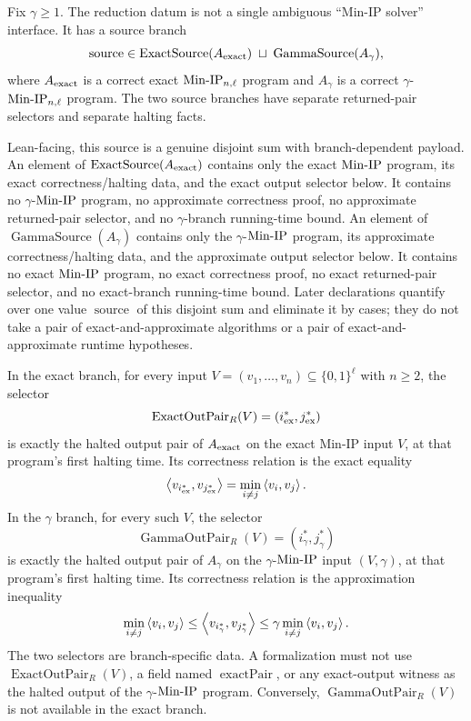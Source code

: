 \begin{definition}
  \label{def:ov-from-minip-reduction-datum}
  Fix $\gamma\geq1$.  The reduction datum is not a single ambiguous
  ``Min-IP solver'' interface.  It has a source branch
  \[
    \operatorname{source}\in
      \operatorname{ExactSource}(A_{\rm exact})
      \;\sqcup\;
      \operatorname{GammaSource}(A_{\gamma}),
  \]
  where $A_{\rm exact}$ is a correct exact $\mathrm{Min\mbox{-}IP}_{n,\ell}$ program and
  $A_{\gamma}$ is a correct $\gamma$-$\mathrm{Min\mbox{-}IP}_{n,\ell}$ program.  The two
  source branches have separate returned-pair selectors and separate halting
  facts.

  Lean-facing, this source is a genuine disjoint sum with branch-dependent
  payload.  An element of
  $\operatorname{ExactSource}(A_{\rm exact})$ contains only the exact
  $\mathrm{Min\mbox{-}IP}$ program, its exact correctness/halting data, and the exact output
  selector below.  It contains no $\gamma$-$\mathrm{Min\mbox{-}IP}$ program, no approximate
  correctness proof, no approximate returned-pair selector, and no
  $\gamma$-branch running-time bound.  An element of
  $\operatorname{GammaSource}(A_{\gamma})$ contains only the
  $\gamma$-$\mathrm{Min\mbox{-}IP}$ program, its approximate correctness/halting data, and the
  approximate output selector below.  It contains no exact $\mathrm{Min\mbox{-}IP}$ program, no
  exact correctness proof, no exact returned-pair selector, and no exact-branch
  running-time bound.  Later declarations quantify over one value
  $\operatorname{source}$ of this disjoint sum and eliminate it by cases; they
  do not take a pair of exact-and-approximate algorithms or a pair of
  exact-and-approximate runtime hypotheses.

  In the exact branch, for every input
  $V=(v_1,\ldots,v_n)\subseteq\{0,1\}^{\ell}$ with $n\geq2$, the selector
  \[
    \operatorname{ExactOutPair}_R(V)=(i^*_{\rm ex},j^*_{\rm ex})
  \]
  is exactly the halted output pair of $A_{\rm exact}$ on the exact Min-IP
  input $V$, at that program's first halting time.  Its correctness relation is
  the exact equality
  \[
    \left\langle v_{i^*_{\rm ex}},v_{j^*_{\rm ex}}\right\rangle
      =\min_{i\neq j}\left\langle v_i,v_j\right\rangle.
  \]
  In the $\gamma$ branch, for every such $V$, the selector
  \[
    \operatorname{GammaOutPair}_R(V)=(i^*_{\gamma},j^*_{\gamma})
  \]
  is exactly the halted output pair of $A_{\gamma}$ on the
  $\gamma$-$\mathrm{Min\mbox{-}IP}$ input $(V,\gamma)$, at that program's first halting time.
  Its correctness relation is the approximation inequality
  \[
    \min_{i\neq j}\left\langle v_i,v_j\right\rangle
      \leq
    \left\langle v_{i^*_{\gamma}},v_{j^*_{\gamma}}\right\rangle
      \leq
    \gamma\min_{i\neq j}\left\langle v_i,v_j\right\rangle.
  \]
  The two selectors are branch-specific data.  A formalization must not use
  $\operatorname{ExactOutPair}_R(V)$, a field named
  $\operatorname{exactPair}$, or any exact-output witness as the halted output
  of the $\gamma$-$\mathrm{Min\mbox{-}IP}$ program.  Conversely,
  $\operatorname{GammaOutPair}_R(V)$ is not available in the exact branch.


\end{definition}
